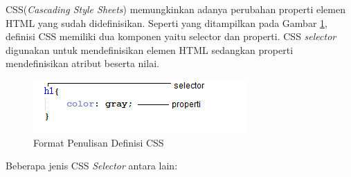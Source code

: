 CSS(\textit{Cascading Style Sheets}) memungkinkan adanya perubahan properti elemen HTML yang sudah didefinisikan\cite{Meyer:2012}. Seperti yang ditampilkan pada Gambar \ref{fig:2_selector_ex}, definisi CSS memiliki dua komponen yaitu selector dan properti. CSS \textit{selector} digunakan untuk mendefinisikan elemen HTML sedangkan properti mendefinisikan atribut beserta nilai. 
		\begin{figure}[H]
			\centering
			\includegraphics[scale=0.8]{Gambar/selector-ex}
			\caption{Format Penulisan Definisi CSS} 
			\label{fig:2_selector_ex}
		\end{figure}
Beberapa jenis CSS \textit{Selector} antara lain:
